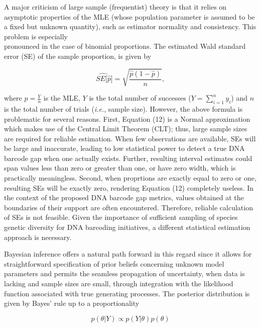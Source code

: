 \documentclass[12pt]{article}
\begin{document}
A major criticism of large sample (frequentist) theory is that it relies on asymptotic properties of the MLE (whose population parameter is assumed to be a fixed but unknown quantity), such as estimator normality and consistency. This problem is especially \\ pronounced in the case of binomial proportions. The estimated Wald standard error (SE) of the sample proportion, is given by 

\begin{equation}
\widehat{SE[\hat{p}}] = \sqrt{\frac{\hat{p}(1 - \hat{p})}{n}},
\end{equation}

\noindent where $\hat{p} = \frac{Y}{n}$ is the MLE, $Y$ is the total number of successes ($Y = \sum_{i=1}^n{y_i}$) and $n$ is the total number of trials (\textit{i.e.}, sample size). However, the above formula is problematic for several reasons. First, Equation (12) is a Normal approximation which makes use of the Central Limit Theorem (CLT); thus, large sample sizes are required for reliable estimation. When few observations are available, SEs will be large and inaccurate, leading to low statistical power to detect a true DNA barcode gap when one actually exists. Further, resulting interval estimates could span values less than zero or greater than one, or have zero width, which is practically meaningless. Second, when proprtions are exactly equal to zero or one, resulting SEs will be exactly zero, rendering Equation (12) completely useless. In the context of the proposed DNA barcode gap metrics, values obtained at the boundaries of their support are often encountered. Therefore, reliable calculation of SEs is not feasible. Given the importance of sufficient sampling of species genetic diversity for DNA barcoding initiatives, a different statistical estimation approach is necessary. 

Bayesian inference offers a natural path forward in this regard since it allows for \\ straightforward specification of prior beliefs concerning unknown model parameters and permits the seamless propagation of uncertainty, when data is lacking and sample sizes are small, through integration with the likelihood function associated with true generating processes. The posterior distribution is given by Bayes' rule up to a proportionality

\begin{equation}
p(\theta | Y) \propto p(Y | \theta)p(\theta)
\end{equation}
\end{document}

